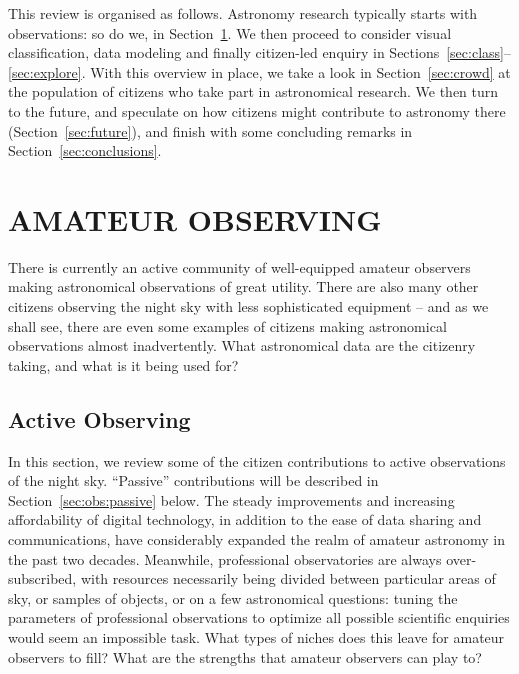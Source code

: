 \documentclass{ar2e}
\def\Sref#1{Section~\ref{#1}\xspace}
\begin{document}
This review is organised as follows. Astronomy research typically starts with
observations: so do we, in \Sref{sec:obs}. We then proceed to consider visual
classification, data modeling and finally citizen-led enquiry in 
Sections~\ref{sec:class}--\ref{sec:explore}. With this overview in place, we
take a look in \Sref{sec:crowd} at the population of citizens who take part in
astronomical research. We then turn to the future, and speculate on how citizens
might contribute to astronomy there (\Sref{sec:future}), and finish with some
concluding remarks in \Sref{sec:conclusions}.



\section{AMATEUR OBSERVING}
\label{sec:obs}

There is currently an active community of well-equipped amateur observers making
astronomical observations of great utility. There are also many other citizens
observing the night sky with less sophisticated equipment -- and as we shall
see, there are even some examples of citizens making astronomical observations
almost inadvertently. What astronomical data are the citizenry taking, and what
is it being used for?



\subsection{Active Observing}
\label{sec:obs:active}

In this section, we review some of the citizen contributions to active
observations of the night sky.  ``Passive'' contributions  will be described in
\Sref{sec:obs:passive} below. The steady improvements and increasing
affordability of digital technology, in addition to the ease of data sharing and
communications, have considerably expanded the realm of amateur astronomy in the
past two decades.  Meanwhile, professional observatories are always
over-subscribed, with resources necessarily being divided between particular
areas of sky, or samples of objects, or on a few astronomical questions: tuning
the parameters of professional observations to optimize all possible scientific
enquiries would seem an impossible task. What types of  niches does this leave
for amateur observers to fill? What are the strengths that amateur observers can
play to?
\end{document}
